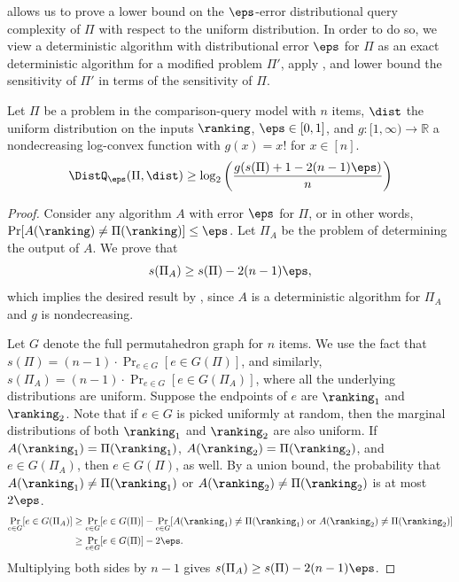  allows us to prove a lower bound on the $\eps$-error distributional query complexity of $\Pi$ with respect to the uniform distribution. In order to do so, we view a deterministic algorithm with distributional error $\eps$ for $\Pi$ as an exact deterministic algorithm for a modified problem $\Pi'$, apply , and lower bound the sensitivity of $\Pi'$ in terms of the sensitivity of $\Pi$.

\begin{proposition}
	\label{claim:sensitivity:partial}
	Let $\Pi$ be a problem in the comparison-query model with $n$ items, $\dist$ the uniform distribution on the inputs $\ranking$, $\eps\in [0,1]$, and $g: [1,\infty) \to \mathbb{R}$ a nondecreasing log-convex function with $g(x) = x!$ for $x \in [n]$.
	\begin{equation}\label{eq:prop:sensitivity:randomized}
	\DistQ_{\eps}(\Pi,\dist)\ge \log_2 \left(\frac{g(s(\Pi)+1-2(n-1)\eps)}{n}\right)
	\end{equation}
\end{proposition}

\begin{proof}
	Consider any algorithm $A$ with error $\eps$ for $\Pi$, or in other words, $\Pr[A(\ranking)\neq\Pi(\ranking)] \le \eps$. Let $\Pi_A$ be the problem of determining the output of $A$. We prove that 
	\[ s(\Pi_A)\ge s(\Pi)-2(n-1)\eps,\]
	which implies the desired result by , since $A$ is a deterministic algorithm for $\Pi_A$ and $g$ is nondecreasing.
	
	Let $G$ denote the full permutahedron graph for $n$ items. We use the fact that $s(\Pi)=(n-1)\cdot \Pr_{e\in G}[e \in G(\Pi)]$, and similarly, $s(\Pi_A)=(n-1)\cdot \Pr_{e\in G}[e \in G(\Pi_A)]$, where all the underlying distributions are uniform. Suppose the endpoints of $e$ are $\ranking_1$ and $\ranking_2$. Note that if $e \in G$ is picked uniformly at random, then the marginal distributions of both $\ranking_1$ and $\ranking_2$ are also uniform. If $A(\ranking_1)=\Pi(\ranking_1)$, $A(\ranking_2)=\Pi(\ranking_2)$, and $e\in G(\Pi_A)$, then $e\in G(\Pi)$, as well. By a union bound, the probability that $A(\ranking_1) \neq \Pi(\ranking_1)$ or $A(\ranking_2) \neq \Pi(\ranking_2)$ is at most $2\eps$. 
	\begin{align*}
		\Pr_{e\in G}[e\in G(\Pi_A)] &\ge \Pr_{e\in G}[e\in G(\Pi)] - \Pr_{e\in G}[A(\ranking_1)\neq \Pi(\ranking_1)\text{ or }A(\ranking_2)\neq \Pi(\ranking_2)]\\
		&\ge \Pr_{e\in G}[e\in G(\Pi)] - 2\eps.
	\end{align*}
	Multiplying both sides by $n-1$ gives $s(\Pi_A)\ge s(\Pi)-2(n-1)\eps$.
\end{proof}

